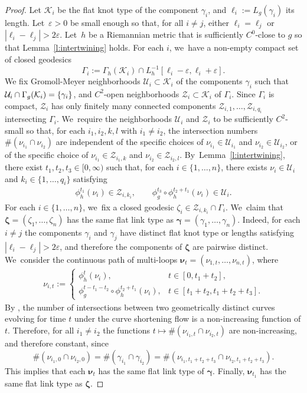 \documentclass[JEP,XML,SOM,Unicode,NoFloatCountersInSection,published]{cedram}
\let\epsilon\varepsilon
\let\bm\boldsymbol
\newcommand{\KK}{\mathcal{K}}
\newcommand{\UU}{\mathcal{U}}
\newcommand{\ZZ}{\mathcal{Z}}
\theoremstyle{plain}
\theoremstyle{definition}
\begin{document}
\begin{proof}
Let $\KK_i$ be the flat knot type of the component $\gamma_i$, and $\ell_i:=L_g(\gamma_i)$ its length. Let~$\epsilon>0$ be small enough so that, for all $i\neq j$, either $\ell_i=\ell_j$ or $|\ell_i-\ell_j|>2\epsilon$. Let~$h$ be a Riemannian metric that is sufficiently $C^0$-close to $g$ so that Lemma~\ref{l:intertwining} holds. For each $i$, we~have a non-empty compact set of closed geodesics
\[
\Gamma_i:=\Gamma_h(\KK_i)\cap L_h^{-1}[\ell_i-\epsilon,\ell_i+\epsilon].
\]
We fix Gromoll-Meyer neighborhoods $\UU_i\subset\KK_i$ of the components $\gamma_i$ such that $\UU_i\cap\nobreak\Gamma_g(\KK_i)=\{\gamma_i\}$, and $C^2$-open neighborhoods $\ZZ_{i}\subset\KK_i$ of $\Gamma_i$.
Since $\Gamma_i$ is compact, $\ZZ_i$ has only finitely many connected components $\ZZ_{i,1},\dots,\ZZ_{i,q_i}$ intersecting $\Gamma_i$. We~require the neighborhoods $\UU_i$ and $\ZZ_i$ to be sufficiently $C^2$-small so that, for each $i_1,i_2,k,l$ with $i_1\neq i_2$, the intersection numbers $\#(\nu_{i_1}\cap\nu_{i_2})$ are independent of the specific choices of $\nu_{i_1}\in\UU_{i_1}$ and $\nu_{i_2}\in\UU_{i_2}$, or of the specific choice of $\nu_{i_1}\in\ZZ_{i_1,k}$ and $\nu_{i_2}\in\ZZ_{i_2,l}$. By~Lemma~\ref{l:intertwining}, there exist $t_1,t_2,t_3\in[0,\infty)$ such that, for each $i\in\{1,\dots,n\}$, there exists $\nu_i\in\UU_i$ and $k_i\in\{1,\dots,q_i\}$ satisfying
\begin{align*}
\phi_h^{t_1}(\nu_i)\in\ZZ_{i,k_i},
\qquad
\phi_g^{t_3}\circ\phi_h^{t_2+t_1}(\nu_i)\in\UU_i.
\end{align*}
For each $i\in\{1,\dots,n\}$, we~fix a closed geodesic $\zeta_i\in \ZZ_{i,k_i}\cap\Gamma_i$. We~claim that $\bm\zeta=(\zeta_{1},\dots,\zeta_{n})$ has the same flat link type as $\bm\gamma=(\gamma_1,\dots,\gamma_n)$. Indeed, for each $i\neq j$ the components $\gamma_i$ and $\gamma_j$ have distinct flat knot type or lengths satisfying $|\ell_i-\ell_j|>2\epsilon$, and therefore the components of $\bm\zeta$ are pairwise distinct. We~consider the continuous path of multi-loops $\bm\nu_t=(\nu_{1,t},\dots,\nu_{n,t})$, where
\begin{align*}
\nu_{i,t}
:=
\begin{cases}
\phi_h^t(\nu_i), & t\in[0,t_1+t_2],  \\
\phi_g^{t-t_1-t_2}\circ\phi_h^{t_2+t_1}(\nu_i), & t\in[t_1+t_2,t_1+t_2+t_3].
\end{cases}
\end{align*}
By \cite[Lem.\,3.3]{Angenent:2005aa}, the number of intersections between two geometrically distinct curves evolving for time $t$ under the curve shortening flow is a non-increasing function of $t$. Therefore, for all $i_1\neq i_2$ the functions $t\mapsto\#(\nu_{i_1,t}\cap\nu_{i_2,t})$ are non-increasing, and therefore constant, since
\[
\#(\nu_{i_1,0}\cap\nu_{i_2,0})
=
\#(\gamma_{i_1}\cap\gamma_{i_2})
=
\#(\nu_{i_1,t_1+t_2+t_3}\cap\nu_{i_2,t_1+t_2+t_3}).
\]
This implies that each $\bm\nu_t$ has the same flat link type of $\bm\gamma$. Finally, $\bm\nu_{t_1}$ has the same flat link type as $\bm\zeta$.
\end{proof}
\end{document}
